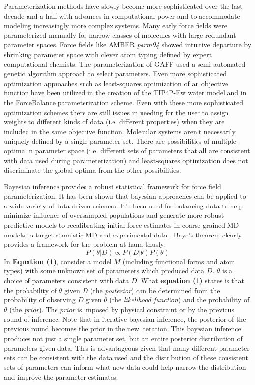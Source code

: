 \documentclass[rmp,nofootinbib,superscriptaddress,12pt,tightenlines,notitlepage]{revtex4-1}
\begin{document}
Parameterization methods have slowly become more sophisticated over the last decade and a 
half with advances in computational power and to accommodate modeling increasingly more complex systems. Many early 
force fields were parameterized manually for narrow classes of molecules with large redundant parameter spaces.\cite{mm1} Force fields like AMBER 
\textit{parm94} showed intuitive departure by shrinking parameter space with clever atom typing defined by expert 
computational chemists.\cite{parm94} The parameterization of GAFF used a semi-automated genetic algorithm approach 
to select parameters.\cite{amber} Even more sophisticated optimization approaches such as least-squares optimization 
of an objective function have been utilized in the creation of the TIP4P-Ew water model\cite{tip4pew} and in the 
ForceBalance parameterization scheme\cite{FB1,FB2,FB3}. Even with these more sophisticated optimization schemes there 
are still issues in needing for the user to assign weights to different kinds of data (i.e. different properties) when 
they are included in the same objective function. Molecular systems aren't necessarily uniquely defined by a single 
parameter set. There are possibilities of multiple optima in parameter space (i.e. different sets of parameters that 
all are consistent with data used during parameterization) and least-squares optimization does not discriminate the 
global optima from the other possibilities.

Bayesian inference provides a robust statistical framework for force field parameterization. It has been shown that 
bayesian approaches can be applied to a wide variety of data driven sciences. It's been used for balancing data to 
help minimize influence of oversampled populations and generate more robust predictive models\cite{bayes_imbalance} 
to recalibrating initial force estimates in coarse grained MD models to target atomistic MD and experimental data
\cite{bayes_coarse}. Baye's theorem clearly provides a framework for the problem at hand thusly:
\begin{equation} P\left(\theta|D\right) \propto P\left(D|\theta\right) P\left(\theta\right)\end{equation}
In \textbf{Equation (1)}, consider a model $M$ (including functional forms and atom types) with some unknown set of 
parameters which produced data $D$. $\theta$ is a choice of parameters consistent with data $D$. What \textbf{equation 
(1)} states is that the probability of $\theta$ given $D$ (the \textit{posterior}) can be determined from the probability 
of observing $D$ given $\theta$ (the \textit{likelihood function}) and the probability of $\theta$ (the \textit{prior}). The 
\textit{prior} is imposed by physical constraint or by the previous round of inference. Note that in 
iterative bayesian inference, the posterior of the previous round becomes the prior in the new iteration. This bayesian 
inference produces not just a single parameter set, but an entire posterior distribution of parameters given data. This is advantageous 
given that many different parameter sets can be consistent with the data used and the distribution of these consistent 
sets of parameters can inform what new data could help narrow the distribution and improve the parameter estimates. 
\end{document}
